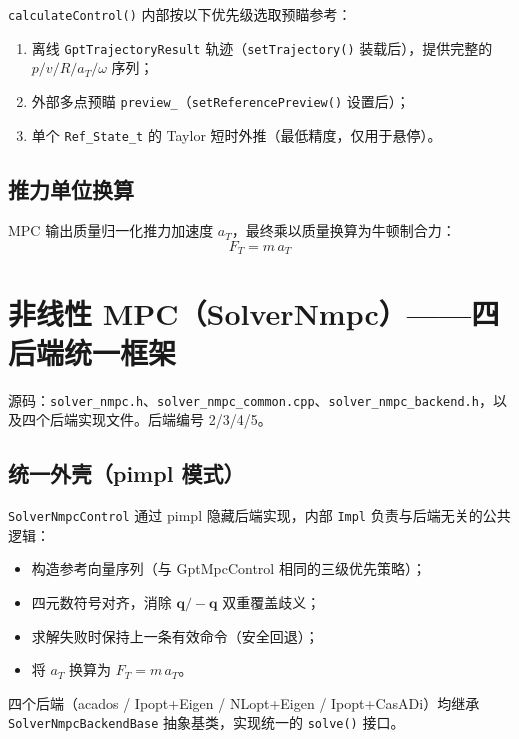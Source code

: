 \documentclass[UTF8, a4paper, 11pt]{ctexart}
\newcommand{\bq}{\mathbf{q}}
\begin{document}
\texttt{calculateControl()} 内部按以下优先级选取预瞄参考：
\begin{enumerate}
  \item 离线 \texttt{GptTrajectoryResult} 轨迹（\texttt{setTrajectory()} 装载后），提供完整的 $p/v/R/a_T/\omega$ 序列；
  \item 外部多点预瞄 \texttt{preview\_}（\texttt{setReferencePreview()} 设置后）；
  \item 单个 \texttt{Ref\_State\_t} 的 Taylor 短时外推（最低精度，仅用于悬停）。
\end{enumerate}

\subsection{推力单位换算}

MPC 输出质量归一化推力加速度 $a_T$，最终乘以质量换算为牛顿制合力：
\begin{equation}
  F_T = m\,a_T \tag{M10}
\end{equation}

\section{非线性 MPC（SolverNmpc）——四后端统一框架}

源码：\texttt{solver\_nmpc.h}、\texttt{solver\_nmpc\_common.cpp}、\texttt{solver\_nmpc\_backend.h}，以及四个后端实现文件。后端编号 2/3/4/5。

\subsection{统一外壳（pimpl 模式）}

\texttt{SolverNmpcControl} 通过 pimpl 隐藏后端实现，内部 \texttt{Impl} 负责与后端无关的公共逻辑：
\begin{itemize}
  \item 构造参考向量序列（与 GptMpcControl 相同的三级优先策略）；
  \item 四元数符号对齐，消除 $\bq/-\bq$ 双重覆盖歧义；
  \item 求解失败时保持上一条有效命令（安全回退）；
  \item 将 $a_T$ 换算为 $F_T = m\,a_T$。
\end{itemize}
四个后端（acados / Ipopt+Eigen / NLopt+Eigen / Ipopt+CasADi）均继承 \texttt{SolverNmpcBackendBase} 抽象基类，实现统一的 \texttt{solve()} 接口。
\end{document}
